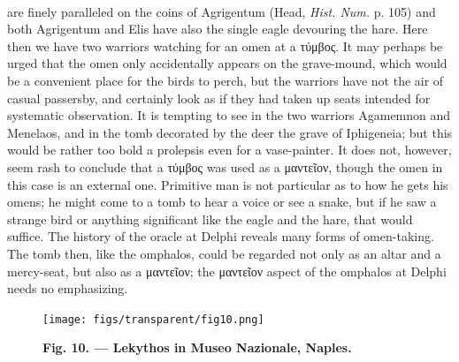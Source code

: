 \documentclass[a4paper, 11pt, oneside, polutonikogreek, english]{article}
\begin{document}
\paragraph{}
are finely paralleled on the coins of Agrigentum (Head, \emph{Hist. Num.} p. 105) and both Agrigentum and Elis have also the single eagle devouring the hare. Here then we have two warriors watching for an omen at a τύμβος. It may perhaps be urged that the omen only accidentally appears on the grave-mound, which would be a convenient place for the birds to perch, but the warriors have not the air of casual passersby, and certainly look as if they had taken up seats intended for systematic observation. It is tempting to see in the two warriors Agamemnon and Menelaos, and in the tomb decorated by the deer the grave of Iphigeneia; but this would be rather too bold a prolepsis even for a vase-painter. It does not, however, seem rash to conclude that a τύμβος was used as a μαντεῖον, though the omen in this case is an external one. Primitive man is not particular as to how he gets his omens; he might come to a tomb to hear a voice or see a snake, but if he saw a strange bird or anything significant like the eagle and the hare, that would suffice. The history of the oracle at Delphi reveals many forms of omen-taking. The tomb then, like the omphalos, could be regarded not only as an altar and a mercy-seat, but also as a μαντεῖον; the μαντεῖον aspect of the omphalos at Delphi needs no emphasizing.
\begin{figure}[H]
\centering
\texttt{[image: figs/transparent/fig10.png]}
\caption{\bfseries Fig. 10. --- Lekythos in Museo Nazionale, Naples.}
\end{figure}
\end{document}
